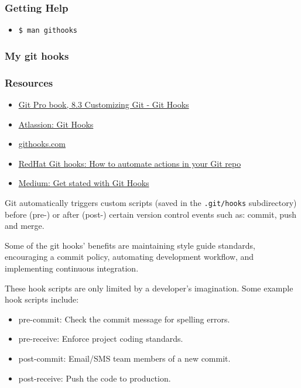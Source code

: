 \subsubsection{Getting Help}%
\begin{itemize}
  \item \texttt{\$ man githooks}
\end{itemize}

\subsubsection{My git hooks}%


\subsubsection{Resources}%
\begin{itemize}
  \item \href{https://git-scm.com/book/en/v2/Customizing-Git-Git-Hooks}{Git Pro book, 8.3 Customizing Git - Git Hooks} 
  \item \href{https://www.atlassian.com/git/tutorials/git-hooks}{Atlassion: Git Hooks} 
  \item \href{https://githooks.com/}{githooks.com} 
  \item \href{https://www.redhat.com/sysadmin/git-hooks}{RedHat Git hooks: How to automate actions in your Git repo}
  \item \href{https://medium.com/@f3igao/get-started-with-git-hooks-5a489725c639}{Medium: Get stated with Git Hooks} 
\end{itemize}
Git automatically triggers custom scripts (saved in the \texttt{.git/hooks} subdirectory) before (pre-) or after (post-) certain version control events such as: commit, push and merge.

Some of the git hooks' benefits are maintaining style guide standards, encouraging a commit policy, automating development workflow, and implementing continuous integration.

These hook scripts are only limited by a developer's imagination. Some example hook scripts include:
\begin{itemize}
  \item    pre-commit: Check the commit message for spelling errors.
  \item    pre-receive: Enforce project coding standards.
  \item    post-commit: Email/SMS team members of a new commit.
  \item    post-receive: Push the code to production.
\end{itemize}


